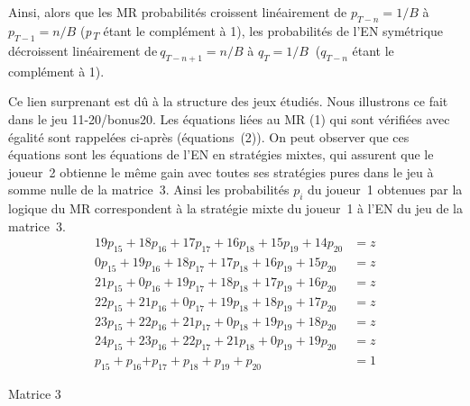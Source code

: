 \begin{Article}
\begin{refsection}[UmbhauerFR]
Ainsi, alors que les MR probabilités croissent linéairement de
\(p_{T - n} = 1/B\) à \(p_{T - 1} = n/B\) (\emph{p\textsubscript{T}}
étant le complément à 1), les probabilités de l'EN symétrique
décroissent linéairement de\(\ q_{T - n + 1} = n/B\) à \(q_{T} = 1/B\ \)
($q_{T-n}$ étant le complément à 1).

\vspace{0.2cm}
Ce lien surprenant est dû à la structure des jeux étudiés. Nous
illustrons ce fait dans le jeu 11-20/bonus20. Les équations liées au MR
(1) qui sont vérifiées avec égalité sont rappelées ci-après (équations~(2)). On peut observer que ces équations sont les équations de l'EN en
stratégies mixtes, qui assurent que le joueur~2 obtienne le même gain
avec toutes ses stratégies pures dans le jeu à somme nulle de la matrice~3. Ainsi les probabilités $p_i$ du joueur~1 obtenues
par la logique du MR correspondent à la stratégie mixte du joueur~1 à
l'EN du jeu de la matrice~3.
%
\begin{align*}
19p_{15} + 18p_{16} + 17p_{17} + 16p_{18} + 15p_{19} + 14p_{20} &= z \\
0p_{15} + 19p_{16} + 18p_{17} + 17p_{18} + 16p_{19} + 15p_{20} &= z \\
21p_{15} + 0p_{16} + 19p_{17} + 18p_{18} + 17p_{19} + 16p_{20} &= z \\
22p_{15} + 21p_{16} + 0p_{17} + 19p_{18} + 18p_{19} + 17p_{20} &= z \\ \tag{2}
23p_{15} + 22p_{16} + 21p_{17} + 0p_{18} + 19p_{19} + 18p_{20} &= z \\
24p_{15} + 23p_{16} + 22p_{17} + 21p_{18} + 0p_{19} + 19p_{20} &= z \\
p_{15} + p_{16}{+ p}_{17} + p_{18} + p_{19} + p_{20} &= 1
\end{align*}

\begin{table}[h!]
\centering
Matrice 3\par
\vspace{0.2cm}
\label{matrice3}
\end{table}


\end{refsection}
\end{Article}
